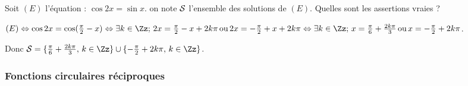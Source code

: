 \begin{question} 

Soit $(E)$ l'équation : $ \cos 2x = \sin x $. on note $\cal{S}$ l'ensemble des solutions de $(E)$. Quelles sont les assertions vraies ?

\begin{answers}



\end{answers}
\begin{explanations}
$(E) \Leftrightarrow  \cos 2x =  \cos ( \frac{\pi}{2} -x) \Leftrightarrow      \exists k\in \Zz; \,  2x =  \frac{\pi}{2} -x +2k\pi \, \mbox {ou} \, 2x =  -\frac{\pi}{2} +x +2k\pi  \Leftrightarrow      \exists k\in \Zz;\,  x =  \frac{\pi}{6}  +\frac{ 2k\pi}{3} \, \mbox {ou} \, x =  -\frac{\pi}{2} +2k\pi$. 

Donc ${\cal{S}} = \{\frac{\pi}{6}  +\frac{ 2k\pi}{3}, \, k\in \Zz \} \cup \{ -\frac{\pi}{2} +2k\pi, \,  k\in \Zz \} $.

\end{explanations}


\end{question}


\subsubsection{Fonctions circulaires réciproques}

